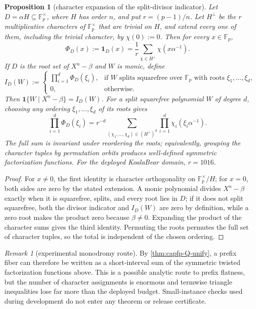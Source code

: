 \documentclass[11pt]{article}
\newtheorem{proposition}[proposition]{Proposition}
\theoremstyle{definition}
\theoremstyle{remark}
\newtheorem{remark}[remark]{Remark}
\newcommand{\F}{\mathbb{F}}
\begin{document}
\begin{proposition}[character expansion of the split-divisor indicator]\label{prop:capfp-Q-smooth}
Let $D=\alpha H\subseteq\F_p^\times$, where $H$ has order $n$, and put $r=(p-1)/n$.  Let $H^\perp$ be the $r$ multiplicative characters of $\F_p^\times$ that are trivial on $H$, and extend every one of them, including the trivial character, by $\chi(0):=0$.  Then for every $x\in\F_p$,
\[
        \Phi_D(x):=\mathbf1_D(x)
        =\frac1r\sum_{\chi\in H^\perp}\chi(x\alpha^{-1}).
\]
If $D$ is the root set of $X^n-\beta$ and $W$ is monic, define
\[
I_D(W):=
\begin{cases}
\displaystyle\prod_{i=1}^{d}\Phi_D(\xi_i),
&\text{if $W$ splits squarefree over $\F_p$ with roots $\xi_1,\ldots,\xi_d$,}\\
0,&\text{otherwise.}
\end{cases}
\]
Then $\mathbf1\{W\mid X^n-\beta\}=I_D(W)$.  For a split squarefree
polynomial $W$ of degree $d$, choosing any ordering $\xi_1,\ldots,\xi_d$ of its roots gives
\[
\prod_{i=1}^d\Phi_D(\xi_i)
=
 r^{-d}\sum_{(\chi_1,\ldots,\chi_d)\in(H^\perp)^d}
 \prod_{i=1}^d\chi_i(\xi_i\alpha^{-1}).
\]
The full sum is invariant under reordering the roots; equivalently, grouping the character tuples by permutation orbits produces well-defined symmetric factorization functions.  For the deployed KoalaBear domain, $r=1016$.
\end{proposition}

\begin{proof}
For $x\ne0$, the first identity is character orthogonality on $\F_p^\times/H$; for $x=0$, both sides are zero by the stated extension.  A monic polynomial divides $X^n-\beta$ exactly when it is squarefree, splits, and every root lies in $D$; if it does not split squarefree, both the divisor indicator and $I_D(W)$ are zero by definition, while a zero root makes the product zero because $\beta\ne0$.  Expanding the product of the character sums gives the third identity.  Permuting the roots permutes the full set of character tuples, so the total is independent of the chosen ordering.
\end{proof}

\begin{remark}[experimental monodromy route]
By \cref{thm:capfp-Q-unify}, a prefix fiber can therefore be written as a short-interval sum of the symmetric twisted factorization functions above.  This is a possible analytic route to prefix flatness, but the number of character assignments is enormous and termwise triangle inequalities lose far more than the deployed budget.  Small-instance checks used during development do not enter any theorem or release certificate.
\end{remark}
\end{document}
